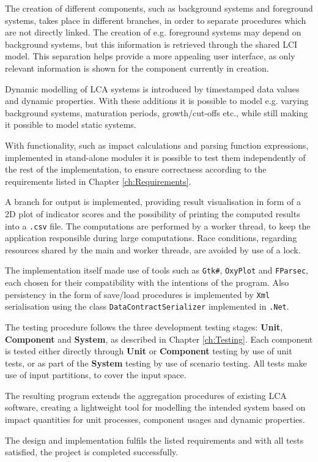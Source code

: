 The creation of different components, such as background systems and foreground systems, takes place in different branches, in order to separate procedures which are not directly linked. The creation of e.g. foreground systems may depend on background systems, but this information is retrieved through the shared LCI model. This separation helps provide a more appealing user interface, as only relevant information is shown for the component currently in creation.

Dynamic modelling of LCA systems is introduced by timestamped data values and dynamic properties. With these additions it is possible to model e.g. varying background systems, maturation periods, growth/cut-offs etc., while still making it possible to model static systems. 

With functionality, such as impact calculations and parsing function expressions, implemented in stand-alone modules it is possible to test them independently of the rest of the implementation, to ensure correctness according to the requirements listed in Chapter \ref{ch:Requirements}.

A branch for output is implemented, providing result visualisation in form of a 2D plot of indicator scores and the possibility of printing the computed results into a \texttt{.csv} file. The computations are performed by a worker thread, to keep the application responsible during large computations. Race conditions, regarding resources shared by the main and worker threads, are avoided by use of a lock.

The implementation itself made use of tools such as \texttt{Gtk\#}, \texttt{OxyPlot} and \texttt{FParsec}, each chosen for their compatibility with the intentions of the program. Also persistency in the form of save/load procedures is implemented by \texttt{Xml} serialisation using the class \texttt{DataContractSerializer} implemented in \texttt{.Net}. 

The testing procedure follows the three development testing stages: \textbf{Unit}, \textbf{Component} and \textbf{System}, as described in Chapter \ref{ch:Testing}. Each component is tested either directly through \textbf{Unit} or \textbf{Component} testing by use of unit tests, or as part of the \textbf{System} testing by use of scenario testing. All tests make use of input partitions, to cover the input space.

\vspace{1cm}
The resulting program extends the aggregation procedures of existing LCA software, creating a lightweight tool for modelling the intended system based on impact quantities for unit processes, component usages and dynamic properties.

The design and implementation fulfils the listed requirements and with all tests satisfied, the project is completed successfully.